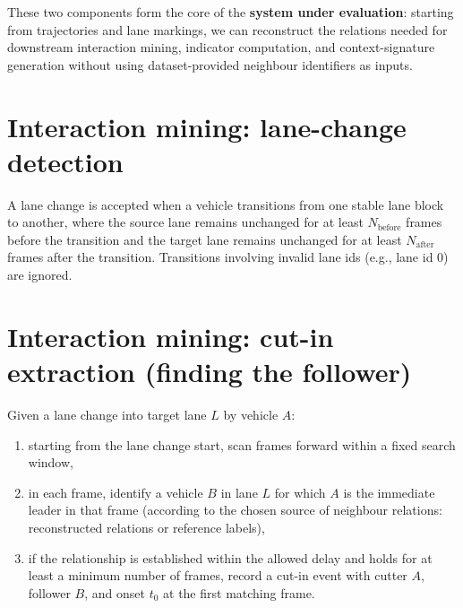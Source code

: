 \documentclass[12pt,a4paper,twoside,openright]{report}
\begin{document}
    \begin{algorithm}[t]
\caption{Same-lane leader/follower reconstruction from geometry}
\label{alg:neighbor-reconstruction}

    \end{algorithm}

    These two components form the core of the \textbf{system under evaluation}: starting from trajectories and lane markings, we can reconstruct the relations needed for downstream interaction mining, indicator computation, and context-signature generation without using dataset-provided neighbour identifiers as inputs.


    \section{Interaction mining: lane-change detection}
    A lane change is accepted when a vehicle transitions from one stable lane block to another, where the source lane remains unchanged for at least $N_\text{before}$ frames before the transition and the target lane remains unchanged for at least $N_\text{after}$ frames after the transition. Transitions involving invalid lane ids (e.g., lane id 0) are ignored.

    \section{Interaction mining: cut-in extraction (finding the follower)}
    Given a lane change into target lane $L$ by vehicle $A$:
    \begin{enumerate}[leftmargin=1.6em]
  \item starting from the lane change start, scan frames forward within a fixed search window,
  \item in each frame, identify a vehicle $B$ in lane $L$ for which $A$ is the immediate leader in that frame (according to the chosen source of neighbour relations: reconstructed relations or reference labels),
  \item if the relationship is established within the allowed delay and holds for at least a minimum number of frames, record a cut-in event with cutter $A$, follower $B$, and onset $t_0$ at the first matching frame.
    \end{enumerate}
\end{document}
